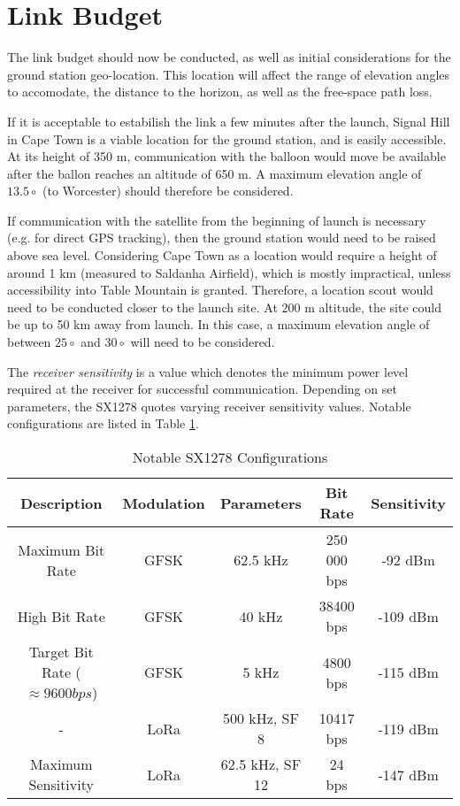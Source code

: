 \section{Link Budget}

The link budget should now be conducted, as well as initial considerations for the ground station geo-location. This location will affect the range of elevation angles to accomodate, the distance to the horizon, as well as the free-space path loss.

If it is acceptable to estabilish the link a few minutes after the launch, Signal Hill in Cape Town is a viable location for the ground station, and is easily accessible. At its height of 350 m, communication with the balloon would move be available after the ballon reaches an altitude of 650 m. A maximum elevation angle of $13.5 \circ$ (to Worcester) should therefore be considered.

If communication with the satellite from the beginning of launch is necessary (e.g. for direct GPS tracking), then the ground station would need to be raised above sea level. Considering Cape Town as a location would require a height of around 1 km (measured to Saldanha Airfield), which is mostly impractical, unless accessibility into Table Mountain is granted. Therefore, a location scout would need to be conducted closer to the launch site. At 200 m altitude, the site could be up to 50 km away from launch. In this case, a maximum elevation angle of between $25 \circ$ and $30 \circ$ will need to be considered.

The \textit{receiver sensitivity} is a value which denotes the minimum power level required at the receiver for successful communication. Depending on set parameters, the SX1278 quotes varying receiver sensitivity values. Notable configurations are listed in Table \ref{tab:sensitivity_values}.
\begin{table}[!htb]
  \centering
  \renewcommand{\arraystretch}{1.2}
  \begin{tabular}{ |c|c|c|c|c| }
  \hline
  \textbf{Description} & \textbf{Modulation} & \textbf{Parameters} & \textbf{Bit Rate} & \textbf{Sensitivity} \\
  \hline
  Maximum Bit Rate &
  GFSK &
  62.5 kHz &
  250 000 bps &
  -92 dBm \\
  \hline
  High Bit Rate &
  GFSK &
  40 kHz &
  38400 bps &
  -109 dBm \\
  \hline
  Target Bit Rate ($\approx 9600 bps$) &
  GFSK &
  5 kHz &
  4800 bps &
  -115 dBm \\
  \hline
  - &
  LoRa &
  500 kHz, SF 8 &
  10417 bps &
  -119 dBm \\
  \hline
  Maximum Sensitivity &
  LoRa &
  62.5 kHz, SF 12 &
  24 bps &
  -147 dBm \\
  \hline
  \end{tabular}
  \caption{Notable SX1278 Configurations}
  \label{tab:sensitivity_values}
\end{table}

